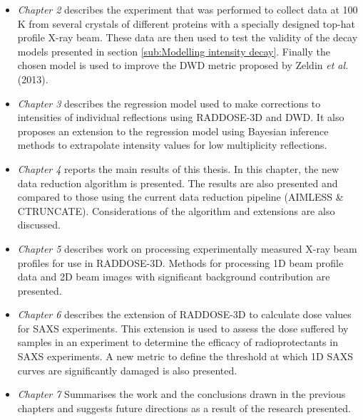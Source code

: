 	\begin{itemize}
        \item \textit{Chapter 2} describes the experiment that was performed to collect data at 100\,K from several crystals of different proteins with a specially designed top-hat profile X-ray beam.
		These data are then used to test the validity of the decay models presented in section \ref{sub:Modelling intensity decay}.
		Finally the chosen model is used to improve the DWD metric proposed by Zeldin \textit{et al.} (2013).
		\item \textit{Chapter 3} describes the regression model used to make corrections to intensities of individual reflections using RADDOSE-3D and DWD. It also proposes an extension to the regression model using Bayesian inference methods to extrapolate intensity values for low multiplicity reflections.
		\item \textit{Chapter 4} reports the main results of this thesis. In this chapter, the new data reduction algorithm is presented.
		The results are also presented and compared to those using the current data reduction pipeline (AIMLESS \& CTRUNCATE).
		Considerations of the algorithm and extensions are also discussed.
		\item \textit{Chapter 5} describes work on processing experimentally measured X-ray beam profiles for use in RADDOSE-3D. Methods for processing 1D beam profile data and 2D beam images with significant background contribution are presented.
		\item \textit{Chapter 6} describes the extension of RADDOSE-3D to calculate dose values for SAXS experiments.
		This extension is used to assess the dose suffered by samples in an experiment to determine the efficacy of radioprotectants in SAXS experiments.
		A new metric to define the threshold at which 1D SAXS curves are significantly damaged is also presented.
		\item \textit{Chapter 7} Summarises the work and the conclusions drawn in the previous chapters and suggests future directions as a result of the research presented.
    \end{itemize}
